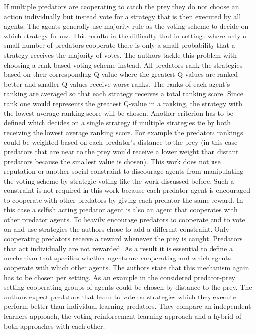 \documentclass[conference]{IEEEtran}
\begin{document}
\newline
If multiple predators are cooperating to catch the prey they do not choose an action individually but instead vote for a strategy that is then executed by all agents. The agents generally use majority rule as the voting scheme to decide on which strategy follow. This results in the difficulty that in settings where only a small number of predators cooperate there is only a small probability that a strategy receives the majority of votes. The authors tackle this problem with choosing a rank-based voting scheme instead. All predators rank the strategies based on their corresponding Q-value where the greatest Q-values are ranked better and smaller Q-values receive worse ranks. The ranks of each agent's ranking are averaged so that each strategy receives a total ranking score. Since rank one would represents the greatest Q-value in a ranking, the strategy with the lowest average ranking score will be chosen. Another criterion has to be defined which decides on a single strategy if multiple strategies tie by both receiving the lowest average ranking score. For example the predators rankings could be weighted based on each predator's distance to the prey (in this case predators that are near to the prey would receive a lower weight than distant predators because the smallest value is chosen).
\newline
This work does not use reputation or another social constraint to discourage agents from manipulating the voting scheme by strategic voting like the work discussed before. Such a constraint is not required in this work because each predator agent is encouraged to cooperate with other predators by giving each predator the same reward. In this case a selfish acting predator agent is also an agent that cooperates with other predator agents. To heavily encourage predators to cooperate and to vote on and use strategies the authors chose to add a different constraint. Only cooperating predators receive a reward whenever the prey is caught. Predators that act individually are not rewarded.
\newline
As a result it is essential to define a mechanism that specifies whether agents are cooperating and which agents cooperate with which other agents. The authors state that this mechanism again has to be chosen per setting. As an example in the considered predator-prey setting cooperating groups of agents could be chosen by distance to the prey.
\newline
The authors expect predators that learn to vote on strategies which they execute perform better than individual learning predators. They compare an independent learners approach, the voting reinforcement learning approach and a hybrid of both approaches with each other.
\end{document}
